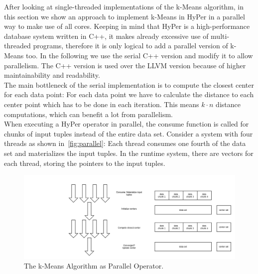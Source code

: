 After looking at single-threaded implementations of the k-Means algorithm, in this section we show an approach to implement k-Means in HyPer in a parallel way to make use of all cores. Keeping in mind that HyPer is a high-performance database system written in C++, it makes already excessive use of multi-threaded programs, therefore it is only logical to add a parallel version of k-Means too. In the following we use the serial C++ version and modify it to allow parallelism. The C++ version is used over the LLVM version because of higher maintainability and readability. 
\\
The main bottleneck of the serial implementation is to compute the closest center for each data point: For each data point we have to calculate the distance to each center point which has to be done in each iteration. This means $k \cdot n$ distance computations, which can benefit a lot from parallelism.
\\
When executing a HyPer operator in parallel, the consume function is called for chunks of input tuples instead of the entire data set. Consider a system with four threads as shown in~\autoref{fig:parallel}: Each thread consumes one fourth of the data set and materializes the input tuples. In the runtime system, there are vectors for each thread, storing the pointers to the input tuples. 


\begin{figure}[htsb]
  \centering
  \includegraphics[scale=0.3]{figures/parallel}
  \caption[The k-Means Algorithm as Parallel Operator]{The k-Means Algorithm as Parallel Operator.}
  \label{fig:parallel}
\end{figure}

